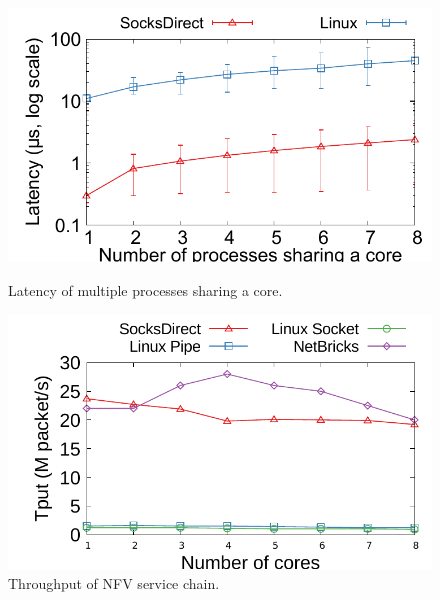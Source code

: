 \begin{figure}[t!]
\begin{minipage}{.31\textwidth}
		\centering \includegraphics[width=\textwidth]{eval/microbenchmark/sharecore-lat.pdf}
		\vspace{-15pt}
		\label{fig:eval-context-switch}
		\caption{Latency of multiple processes sharing a core.}
	\end{minipage}
	\hspace{0.01\textwidth}
	\begin{minipage}{.31\textwidth}
		\centering
		\includegraphics[width=\textwidth]{eval/microbenchmark/nfv-tun-tput.pdf}
		\caption{Throughput of NFV service chain.}
		\label{fig:eval-tun-tput}
		

\end{minipage}
\end{figure}
